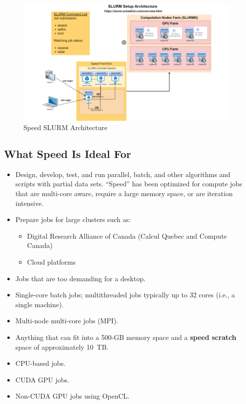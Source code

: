 \documentclass{easychair}
\begin{document}
\begin{figure}[htpb]
	\centering
	\includegraphics[width=\columnwidth]{images/slurm-arch}
	\caption{Speed SLURM Architecture}
	\label{fig:slurm-arch}
\end{figure}

\subsection{What Speed Is Ideal For}
\label{sect:speed-is-for}

\begin{itemize}
	\item
	Design, develop, test, and run parallel, batch, and other algorithms and scripts with partial data sets.
	``Speed'' has been optimized for compute jobs that are multi-core aware,
	require a large memory space, or are iteration intensive.

	\item
	Prepare jobs for large clusters such as:
		\begin{itemize}
			\item Digital Research Alliance of Canada (Calcul Quebec and Compute Canada)
			\item Cloud platforms
		\end{itemize}
	\item
	Jobs that are too demanding for a desktop. 
	\item
	Single-core batch jobs; multithreaded jobs typically up to 32 cores (i.e., a single machine).
	\item
	Multi-node multi-core jobs (MPI).
	\item
	Anything that can fit into a 500-GB memory space and a \textbf{speed scratch} space of approximately 10~TB. 
	\item
	CPU-based jobs. 
	\item
	CUDA GPU jobs.
	\item
	Non-CUDA GPU jobs using OpenCL.
\end{itemize}
\end{document}
